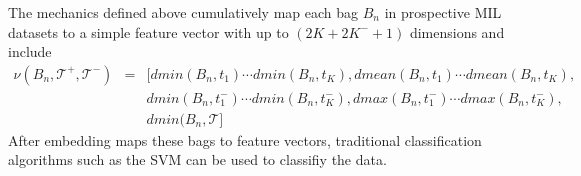 \documentclass[12pt,dvips]{report}
\numberwithin{equation}{section}
\begin{document}
The mechanics defined above cumulatively map each bag $B_n$ in prospective MIL datasets to a simple feature vector with up to $(2K+2K^{-}+1)$ dimensions and include 
\begin{eqnarray} \label{eq:CumulativeEmbedding}
\nu(B_n,\mathcal{T}^+,\mathcal{T}^- ) &=& [dmin(B_n,t_1) \cdots dmin(B_n,t_K),dmean(B_n,t_1) \cdots dmean(B_n,t_K),  \nonumber \\
& & dmin(B_n,t^{-}_1) \cdots dmin(B_n,t^{-}_K), dmax(B_n,t^{-}_1) \cdots dmax(B_n,t^{-}_K), \nonumber\\
& &dmin(B_n,\mathcal{T}]
\end{eqnarray}
After embedding maps these bags to feature vectors, traditional classification algorithms such as the SVM \cite{CorinnaCortes1995} can be used to classifiy the data.




\end{document}
